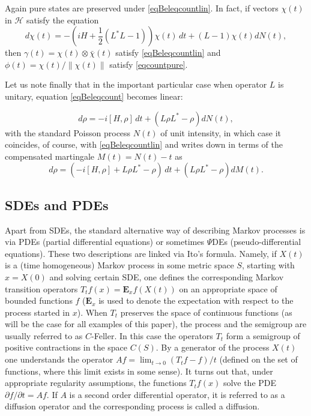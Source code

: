 \documentclass[10pt,a4paper]{amsart}
\def\HC{\mathcal{H}}
\def\E{\mathbf{E}}
\def\pa{\partial}
\def\ga{\gamma}
\begin{document}
Again pure states are preserved under \eqref{eqBeleqcountlin}.
In fact, if vectors $\chi(t)$ in $\HC$ satisfy the equation
\begin{equation}
\label{eqcountpurelinpu}
d \chi(t)=-\left(iH +\frac12 (L^*L-1)\right)\chi(t) \, dt
+(L-1)\chi(t)  dN(t),
\end{equation}
then $\ga(t)=\chi(t)\otimes \bar \chi(t)$ satisfy \eqref{eqBeleqcountlin}
 and $\phi(t)=\chi(t)/\|\chi(t)\|$ satisfy  \eqref{eqcountpure}.

Let us note finally that in the important particular case when operator $L$ is unitary,
equation \eqref{eqBeleqcount} becomes linear:

 \begin{equation}
\label{eqBeleqcountunit}
d\rho=- i[H, \rho]  \, dt
+\left(L\rho L^*-\rho\right) dN(t),
\end{equation}
with the standard Poisson process $N(t)$ of unit intensity, in which case it coincides, of course,
with \eqref{eqBeleqcountlin} and writes down in terms of the compensated martingale $M(t)=N(t)-t$ as
 \begin{equation}
\label{eqBeleqcountunit1}
d\rho=(- i[H, \rho] + L\rho L^*-\rho ) \, dt
+\left(L\rho L^*-\rho\right) dM(t).
\end{equation}

\subsection{SDEs and PDEs}

Apart from SDEs, the standard alternative way of describing Markov processes
is via PDEs (partial differential equations) or sometimes $\Psi$DEs (pseudo-differential equations).
  These two descriptions are linked via Ito's
formula. Namely, if $X(t)$ is a (time homogeneous) Markov process in some metric space $S$,
starting with $x=X(0)$ and solving
certain SDE, one defines the corresponding Markov transition operators  $T_tf(x)=\E_x f(X(t))$ on an
appropriate space of bounded functions $f$ ($\E_x$ is used to denote the
expectation with respect to the process started in $x$).
When $T_t$ preserves the space of continuous
functions (as will be the case for all examples of this paper), the process and the semigroup
are usually referred to as $C$-Feller. In this case the operators $T_t$ form a semigroup of positive
contractions in the space $C(S)$. By a generator
of the process $X(t)$ one understands the operator $Af=\lim_{t\to 0} (T_tf-f)/t$ (defined on the set of functions,
where this limit exists in some sense). It turns out that, under appropriate regularity assumptions,
the functions $T_tf(x)$ solve the PDE $\pa f/\pa t=Af$. If $A$ is a second order differential operator,
it is referred to as a diffusion operator and the corresponding process is called a diffusion.
\end{document}
